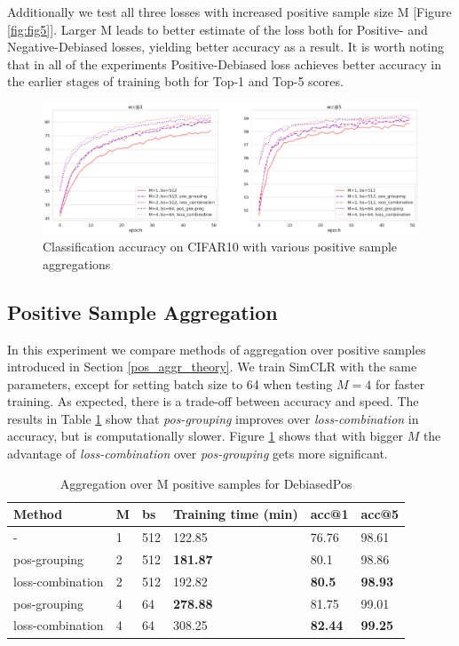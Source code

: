 \documentclass{article}
\begin{document}
Additionally we test all three losses with increased positive sample size M [Figure \ref{fig:fig5}]. Larger M leads to better estimate of the loss both for Positive- and Negative-Debiased losses, yielding better accuracy as a result. It is worth noting that in all of the experiments Positive-Debiased loss achieves better accuracy in the earlier stages of training both for Top-1 and Top-5 scores.

\begin{figure}
\includegraphics[width=1\textwidth]{figures/pg_vs_lc.png}
\caption{Classification accuracy on CIFAR10 with various positive sample aggregations}
\label{fig:fig6}
\end{figure}

\subsection{Positive Sample Aggregation} \label{pos_aggr}
In this experiment we compare methods of aggregation over positive samples introduced in Section \ref{pos_aggr_theory}. We train SimCLR with the same parameters, except for setting batch size to 64 when testing $M=4$ for faster training. As expected, there is a trade-off between accuracy and speed. The results in Table \ref{tab:table} show that \textit{pos-grouping} improves over \textit{loss-combination} in accuracy, but is computationally slower. Figure \ref{fig:fig6} shows that with bigger $M$ the advantage of \textit{loss-combination} over \textit{pos-grouping} gets more significant. 

\begin{table}
    \caption{Aggregation over M positive samples for DebiasedPos}
    \centering
    \begin{tabular}{llllll}
        \toprule
        Method  & M & bs    & Training time (min)   & acc@1 & acc@5\\
        \midrule
        -   & 1 & 512   & 122.85    & 76.76 & 98.61\\
        \midrule
        pos-grouping    & 2 & 512   & \textbf{181.87}   & 80.1  & 98.86\\
        loss-combination    & 2 & 512   & 192.82    & \textbf{80.5} & \textbf{98.93}\\
        \midrule
        pos-grouping    & 4 & 64    & \textbf{278.88}   & 81.75 & 99.01\\
        loss-combination    & 4 & 64    & 308.25    & \textbf{82.44} & \textbf{99.25}\\
        \bottomrule
    \end{tabular}
    \label{tab:table}
\end{table}
\end{document}

